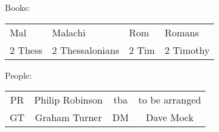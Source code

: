 \documentclass[10pt]{article}
\begin{document}
\begin{center}
{\begin{tabular}
\end{tabular}
}

\vspace{1em}
Books: \begin{tabular}{|l|l|l|l|} \hline
Mal & Malachi &
Rom & Romans \\
2 Thess & 2 Thessalonians &
2 Tim & 2 Timothy \\
  \hline
\end{tabular}
People: \begin{tabular}{|c|c|c|c|}\hline
 PR & Philip Robinson   &
 tba & to be arranged \\
 GT &  Graham Turner &
 DM & Dave Mock \\
     \hline
  \end{tabular}
\end{center}
\end{document}
